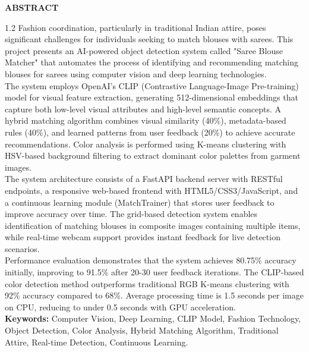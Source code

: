 \documentclass[12pt,a4paper]{report}
\begin{document}
\newpage
\thispagestyle{empty}
\begin{center}
    \textbf{ABSTRACT}
\end{center}
\vspace{0.5cm}
\begin{spacing}{1.2}
Fashion coordination, particularly in traditional Indian attire, poses significant challenges for individuals seeking to match blouses with sarees. This project presents an AI-powered object detection system called "Saree Blouse Matcher" that automates the process of identifying and recommending matching blouses for sarees using computer vision and deep learning technologies. \\

The system employs OpenAI's CLIP (Contrastive Language-Image Pre-training) model for visual feature extraction, generating 512-dimensional embeddings that capture both low-level visual attributes and high-level semantic concepts. A hybrid matching algorithm combines visual similarity (40\%), metadata-based rules (40\%), and learned patterns from user feedback (20\%) to achieve accurate recommendations. Color analysis is performed using K-means clustering with HSV-based background filtering to extract dominant color palettes from garment images. \\

The system architecture consists of a FastAPI backend server with RESTful endpoints, a responsive web-based frontend with HTML5/CSS3/JavaScript, and a continuous learning module (MatchTrainer) that stores user feedback to improve accuracy over time. The grid-based detection system enables identification of matching blouses in composite images containing multiple items, while real-time webcam support provides instant feedback for live detection scenarios. \\

Performance evaluation demonstrates that the system achieves 80.75\% accuracy initially, improving to 91.5\% after 20-30 user feedback iterations. The CLIP-based color detection method outperforms traditional RGB K-means clustering with 92\% accuracy compared to 68\%. Average processing time is 1.5 seconds per image on CPU, reducing to under 0.5 seconds with GPU acceleration. \\

\noindent \textbf{Keywords:} Computer Vision, Deep Learning, CLIP Model, Fashion Technology, Object Detection, Color Analysis, Hybrid Matching Algorithm, Traditional Attire, Real-time Detection, Continuous Learning.
\end{spacing}
\end{document}
